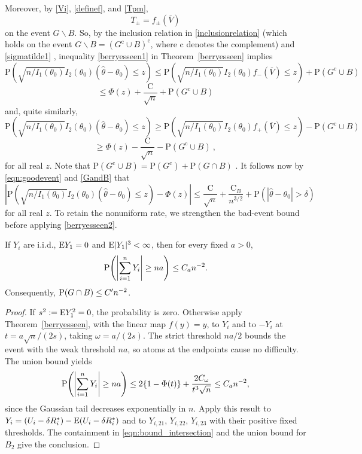 Moreover, by \eqref{Vi}, \eqref{definef}, and \eqref{Tpm},
$$
T_{\pm}=f_{\pm}(\overline{V})
$$
on the event $G\backslash B$. So, by the inclusion relation in \eqref{inclusionrelation} (which holds on the event $G\backslash B=(G^{\mathrm{c}}\cup B)^{\mathrm{c}}$, where $\mathrm{c}$ denotes the complement) and \eqref{sigmatilde1} , inequality \eqref{berryesseen1} in Theorem~\ref{berryesseen} implies
$$
\mathrm{P}(\sqrt{n/I_1(\theta_{0})}I_2(\theta_0)(\hat{\theta}-\theta_{0})\leq z)\leq \mathrm{P}(\sqrt{n/I_1(\theta_{0})}I_2(\theta_0)f_{-}(\overline{V})\leq z)+\mathrm{P}(G^{\mathrm{c}}\cup B)
$$
$$
\leq\Phi(z)+\frac{\mathrm{C}}{\sqrt{n}}+\mathrm{P}(G^{\mathrm{c}}\cup B)
$$
and, quite similarly,
$$
\mathrm{P}(\sqrt{n/I_1(\theta_{0})}I_2(\theta_0)(\hat{\theta}-\theta_{0})\leq z)\geq \mathrm{P}(\sqrt{n/I_1(\theta_{0})}I_2(\theta_0)f_{+}(\overline{V})\leq z)-\mathrm{P}(G^{\mathrm{c}}\cup B)
$$
$$
\geq\Phi(z)-\frac{\mathrm{C}}{\sqrt{n}}-\mathrm{P}(G^{\mathrm{c}}\cup B)\ ,
$$
for all real $z$. Note that $\mathrm{P}(G^{\mathrm{c}}\cup B)=\mathrm{P}(G^{\mathrm{c}})+\mathrm{P}(G\cap B)$ . It follows now by \eqref{eqn:goodevent} and \eqref{GandB} that
\begin{equation}
	|\displaystyle \mathrm{P}(\sqrt{n/I_1(\theta_{0})}I_2(\theta_0)(\hat{\theta}-\theta_{0})\leq z)-\Phi(z)|\leq\frac{\mathrm{C}}{\sqrt{n}}+\frac{\mathrm{C}_{B}}{n^{3/2}}+\mathrm{P}(|\hat{\theta}-\theta_{0}|>\delta)
\end{equation}
for all real $z$. To retain the nonuniform rate, we strengthen the bad-event bound before applying \eqref{berryesseen2}.

\begin{lemma}\label{lem:fixed-threshold}
If $Y_i$ are i.i.d., $\mathrm{E} Y_1=0$ and $\mathrm{E}|Y_1|^3<\infty$, then for every fixed $a>0$,
\[
\mathrm{P}\!\left(\left|\sum_{i=1}^nY_i\right|\geq na\right)\leq C_a n^{-2}.
\]
Consequently, $\mathrm{P}(G\cap B)\leq C'n^{-2}$.
\end{lemma}
\begin{proof}
If $s^2:=\mathrm{E} Y_1^2=0$, the probability is zero. Otherwise apply Theorem~\ref{berryesseen}, with the linear map $f(y)=y$, to $Y_i$ and to $-Y_i$ at $t=a\sqrt{n}/(2s)$, taking $\omega=a/(2s)$. The strict threshold $na/2$ bounds the event with the weak threshold $na$, so atoms at the endpoints cause no difficulty. The union bound yields
\[
\mathrm{P}\!\left(\left|\sum_{i=1}^nY_i\right|\geq na\right)
\leq2\{1-\Phi(t)\}+\frac{2C_{\omega}}{t^3\sqrt{n}}
\leq C_a n^{-2},
\]
since the Gaussian tail decreases exponentially in $n$. Apply this result to $Y_i=(U_i-\delta R_i^*)-\mathrm{E}(U_i-\delta R_i^*)$ and to $Y_{i,21}$, $Y_{i,22}$, $Y_{i,23}$ with their positive fixed thresholds. The containment in \eqref{eqn:bound_intersection} and the union bound for $B_2$ give the conclusion.
\end{proof}

